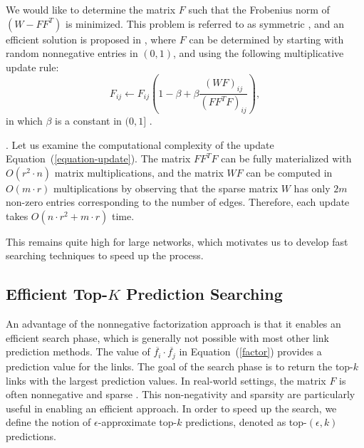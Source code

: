 We would like to determine the matrix $F$ such that the Frobenius
norm of $( W - F F^T)$ is minimized.  This problem is referred to as
symmetric \NMF, and an efficient solution is proposed in
\cite{long}, where $F$ can be determined by starting with random
nonnegative entries in $(0, 1)$, and using the following
multiplicative update rule:
\begin{equation}
\label{equation-update}
F_{ij} \leftarrow F_{ij} \left( 1 - \beta + \beta \frac{ \left(W F \right)_{ij} }{ \left(F F^T F \right)_{ij}} \right),
\end{equation}
in which $\beta$ is a constant in $( 0, 1]$ \cite{ding}.

. Let us examine the computational complexity of
the update Equation~(\ref{equation-update}).
The matrix $F F^T F$  can be fully materialized  with
$O(r^2 \cdot n)$ matrix multiplications, and the matrix $W F$ can be
computed in $O(m \cdot r)$ multiplications  by observing that the
sparse matrix $W$ has only $2m$ non-zero entries corresponding to the
number of edges. Therefore, each update takes $O(n
\cdot r^2 +m\cdot r )$ time.

This remains quite high for large networks, which motivates us to develop fast searching techniques to speed up the process.


\subsection{Efficient Top-$K$ Prediction Searching}
\label{sec-NMF-topk}

An advantage of the nonnegative factorization approach is that it
enables an efficient search phase, which is generally not possible
with most other link prediction methods. The value of
$\overline{f_i} \cdot \overline{f_j}$ in Equation~(\ref{factor}) provides a prediction value
for the links. The goal of the search phase is to return the top-$k$
links with the largest prediction values. In real-world settings, the matrix $F$ is
often nonnegative and sparse \cite{NMF-nature99}. This non-negativity and sparsity are
particularly useful in enabling an efficient approach. In order to
speed up the search, we define the notion of $\epsilon$-approximate
top-$k$ predictions, denoted as top-$(\epsilon, k)$ predictions.


